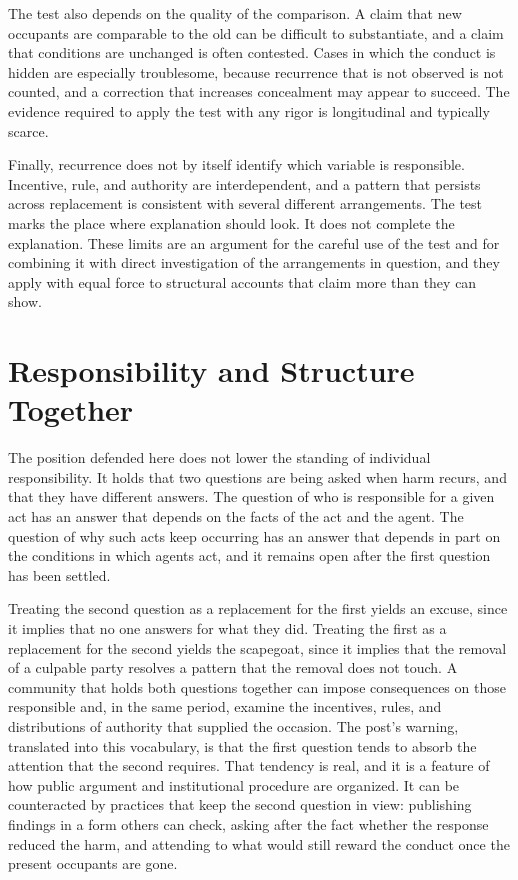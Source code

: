 \documentclass[11pt]{article}
\theoremstyle{definition}
\begin{document}
The test also depends on the quality of the comparison. A claim that new occupants are comparable to the old can be difficult to substantiate, and a claim that conditions are unchanged is often contested. Cases in which the conduct is hidden are especially troublesome, because recurrence that is not observed is not counted, and a correction that increases concealment may appear to succeed. The evidence required to apply the test with any rigor is longitudinal and typically scarce.

Finally, recurrence does not by itself identify which variable is responsible. Incentive, rule, and authority are interdependent, and a pattern that persists across replacement is consistent with several different arrangements. The test marks the place where explanation should look. It does not complete the explanation. These limits are an argument for the careful use of the test and for combining it with direct investigation of the arrangements in question, and they apply with equal force to structural accounts that claim more than they can show.

\section{Responsibility and Structure Together}

The position defended here does not lower the standing of individual responsibility. It holds that two questions are being asked when harm recurs, and that they have different answers. The question of who is responsible for a given act has an answer that depends on the facts of the act and the agent. The question of why such acts keep occurring has an answer that depends in part on the conditions in which agents act, and it remains open after the first question has been settled.

Treating the second question as a replacement for the first yields an excuse, since it implies that no one answers for what they did. Treating the first as a replacement for the second yields the scapegoat, since it implies that the removal of a culpable party resolves a pattern that the removal does not touch. A community that holds both questions together can impose consequences on those responsible and, in the same period, examine the incentives, rules, and distributions of authority that supplied the occasion. The post's warning, translated into this vocabulary, is that the first question tends to absorb the attention that the second requires. That tendency is real, and it is a feature of how public argument and institutional procedure are organized. It can be counteracted by practices that keep the second question in view: publishing findings in a form others can check, asking after the fact whether the response reduced the harm, and attending to what would still reward the conduct once the present occupants are gone.
\end{document}
